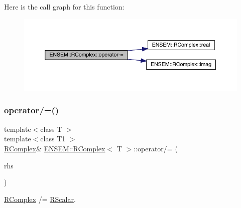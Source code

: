 Here is the call graph for this function\+:
\nopagebreak
\begin{figure}[H]
\begin{center}
\leavevmode
\includegraphics[width=350pt]{d9/d0e/classENSEM_1_1RComplex_aa2ad7391f0a0df5381ae7402b8b1fdb8_cgraph}
\end{center}
\end{figure}
\mbox{\label{classENSEM_1_1RComplex_ace62972244741ac0abcf1d3d1e833604}} 
\subsubsection{\texorpdfstring{operator/=()}{operator/=()}\hspace{0.1cm}{\footnotesize\ttfamily [1/6]}}
{\footnotesize\ttfamily template$<$class T $>$ \\
template$<$class T1 $>$ \\
\mbox{\hyperlink{classENSEM_1_1RComplex}{R\+Complex}}\& \mbox{\hyperlink{classENSEM_1_1RComplex}{E\+N\+S\+E\+M\+::\+R\+Complex}}$<$ T $>$\+::operator/= (\begin{DoxyParamCaption}\item[{const \mbox{\hyperlink{classENSEM_1_1RScalar}{R\+Scalar}}$<$ T1 $>$ \&}]{rhs }\end{DoxyParamCaption})\hspace{0.3cm}{\ttfamily [inline]}}



\mbox{\hyperlink{classENSEM_1_1RComplex}{R\+Complex}} /= \mbox{\hyperlink{classENSEM_1_1RScalar}{R\+Scalar}}. 

